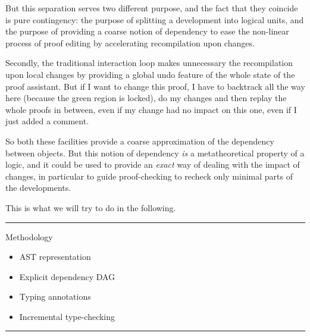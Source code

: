 \documentclass[ignorenonframetext,red]{beamer}
\begin{document}
But this separation serves two different purpose, and the fact that
they coincide is pure contingency: the purpose of splitting a
development into logical units, and the purpose of providing a coarse
notion of dependency to ease the non-linear process of proof editing
by accelerating recompilation upon changes.

Secondly, the traditional interaction loop makes unnecessary the
recompilation upon local changes by providing a global undo feature of
the whole state of the proof assistant. But if I want to change this
proof, I have to backtrack all the way here (because the green region
is locked), do my changes and then replay the whole proofs in between,
even if my change had no impact on this one, even if I just added a
comment.

So both these facilities provide a coarse approximation of the
dependency between objects. But this notion of dependency \emph{is} a
metatheoretical property of a logic, and it could be used to provide
an \emph{exact} way of dealing with the impact of changes, in
particular to guide proof-checking to recheck only minimal parts of
the developments.

This is what we will try to do in the following.

\hrule
\begin{frame}{Methodology}
  \begin{center}
  \end{center}
  \begin{itemize}
  \item<4-> AST representation
  \item<5-> Explicit dependency DAG
  \item<7-> Typing annotations
  \item<8-> Incremental type-checking
  \end{itemize}
\end{frame}
\hrule
\end{document}
